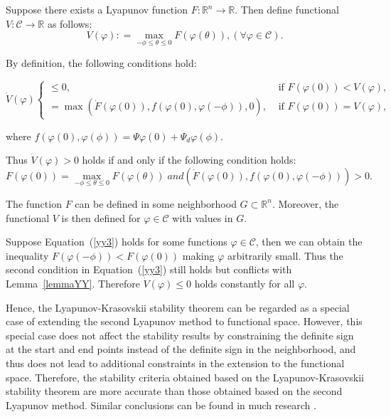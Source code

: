 \documentclass[journal]{IEEEtran}
\begin{document}
Suppose there exists a Lyapunov function $F:\mathbb{R}^n\rightarrow\mathbb{R}$. Then define functional $V:\mathcal{C}\rightarrow\mathbb{R}$ as follows:
\begin{equation}
  V(\varphi ): = \mathop {\max }\limits_{ -\phi \le \theta  \le 0} F(\varphi (\theta )),(\forall \varphi  \in \mathcal{C}).
  \label{yy1}
\end{equation}

By definition, the following conditions hold:
\begin{small}
\begin{equation}
  \dot{V}(\varphi)\left\{\begin{array}{cl}
    \leq 0,                                                          & \text { if } F(\varphi(0))<V(\varphi), \\
    =\max \left(\dot{F}(\varphi(0)), f(\varphi(0), \varphi(-\phi)), 0\right), & \text { if } F(\varphi(0))=V(\varphi),
  \end{array}\right.
\end{equation}
\end{small}

where $f(\varphi(0), \varphi(\phi))=\Psi\varphi(0)+\Psi_d\varphi(\phi)$.

Thus $\dot{V}\left(\varphi\right)>0$ holds if and only if the following condition holds:
\begin{equation}
  F(\varphi (0)) = \mathop {\max }\limits_{ - \phi \le \theta  \le 0} F(\varphi (\theta ))\;and(\dot F(\varphi (0)),f(\varphi(0), \varphi(-\phi))) > 0.
  \label{yy3}
\end{equation}

The function $F$ can be defined in some neighborhood $G\subset\mathbb{R}^n$. Moreover, the functional $V$ is then defined for $\varphi\in\mathcal{C}$ with values in $G$.

Suppose Equation~(\ref{yy3}) holds for some functions $\varphi\in\mathcal{C}$, then we can obtain the inequality $F\left(\varphi\left(-\phi\right)\right)<F\left(\varphi\left(0\right)\right)$ making $\varphi$ arbitrarily small. Thus the second condition in Equation~(\ref{yy3}) still holds but conflicts with Lemma~\ref{lemmaYY}. Therefore $\dot{V}\left(\varphi\right)\le0$ holds constantly for all $\varphi$.

Hence, the Lyapunov-Krasovskii stability theorem can be regarded as a special case of extending the second Lyapunov method to functional space. However, this special case does not affect the stability results by constraining the definite sign at the start and end points instead of the definite sign in the neighborhood, and thus does not lead to additional constraints in the extension to the functional space. Therefore, the stability criteria obtained based on the Lyapunov-Krasovskii stability theorem are more accurate than those obtained based on the second Lyapunov method. Similar conclusions can be found in much research \citep{wang2016fuzzy,lian2020dissipativity}.
\end{document}

